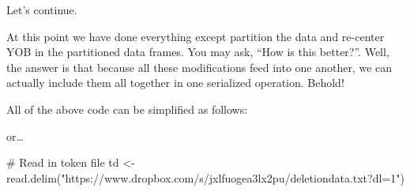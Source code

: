 \documentclass[
  12pt,
  letterpaper]{article}
\newenvironment{Shaded}{\begin{snugshade}}{\end{snugshade}}
\newcommand{\AttributeTok}[1]{\textcolor[rgb]{0.40,0.45,0.13}{#1}}
\newcommand{\CommentTok}[1]{\textcolor[rgb]{0.37,0.37,0.37}{#1}}
\newcommand{\ConstantTok}[1]{\textcolor[rgb]{0.56,0.35,0.01}{#1}}
\newcommand{\FunctionTok}[1]{\textcolor[rgb]{0.28,0.35,0.67}{#1}}
\newcommand{\NormalTok}[1]{\textcolor[rgb]{0.00,0.23,0.31}{#1}}
\newcommand{\OtherTok}[1]{\textcolor[rgb]{0.00,0.23,0.31}{#1}}
\newcommand{\SpecialCharTok}[1]{\textcolor[rgb]{0.37,0.37,0.37}{#1}}
\newcommand{\StringTok}[1]{\textcolor[rgb]{0.13,0.47,0.30}{#1}}
\begin{document}
Let's continue.

\begin{Shaded}
\end{Shaded}

At this point we have done everything except partition the data and
re-center YOB in the partitioned data frames. You may ask, ``How is this
better?''. Well, the answer is that because all these modifications feed
into one another, we can actually include them all together in one
serialized operation. Behold!

All of the above code can be simplified as follows:

or\ldots{}

\begin{Shaded}
\begin{Highlighting}[]
\CommentTok{\# Read in token file}
\NormalTok{td }\OtherTok{\textless{}{-}} \FunctionTok{read.delim}\NormalTok{(}\StringTok{"https://www.dropbox.com/s/jxlfuogea3lx2pu/deletiondata.txt?dl=1"}\NormalTok{)}
\end{Highlighting}
\end{Shaded}
\end{document}
